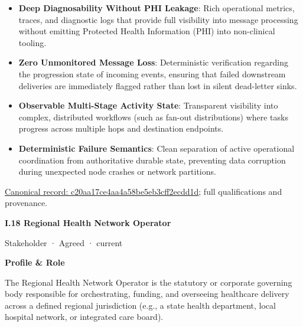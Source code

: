 \begin{itemize}


\item \textbf{Deep Diagnosability Without PHI Leakage}: Rich operational metrics, traces, and diagnostic logs that provide full visibility into message processing without emitting Protected Health Information (PHI) into non-clinical tooling.

\item \textbf{Zero Unmonitored Message Loss}: Deterministic verification regarding the progression state of incoming events, ensuring that failed downstream deliveries are immediately flagged rather than lost in silent dead-letter sinks.

\item \textbf{Observable Multi-Stage Activity State}: Transparent visibility into complex, distributed workflows (such as fan-out distributions) where tasks progress across multiple hops and destination endpoints.

\item \textbf{Deterministic Failure Semantics}: Clean separation of active operational coordination from authoritative durable state, preventing data corruption during unexpected node crashes or network partitions.

\end{itemize}

{\footnotesize \href{../../../../continuum/motivation/stakeholder/c20aa17ce4aa4a58be5eb3cff2ecdd1d.md}{Canonical record: c20aa17ce4aa4a58be5eb3cff2ecdd1d}; full qualifications and provenance.}\par
\par\medskip{}\label{navigation:I.18}
\textbf{I.18 Regional Health Network Operator}\par

\label{element:e76216c494fa4500bb80eda6f83513c1}
{\small Stakeholder · Agreed · current}\par

\par\medskip\textbf{Profile \& Role}\par


The Regional Health Network Operator is the statutory or corporate governing body responsible for orchestrating, funding, and overseeing healthcare delivery across a defined regional jurisdiction (e.g., a state health department, local hospital network, or integrated care board).



